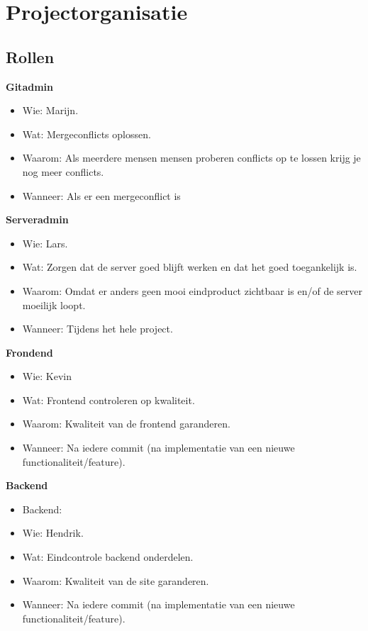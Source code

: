 \documentclass{uva-inf-article}
\begin{document}
\newpage
\section{Projectorganisatie}

\subsection{Rollen}
\textbf{Gitadmin}
\begin{itemize}[noitemsep]
  \item Wie: Marijn.
	\item Wat: Mergeconflicts oplossen.
	\item Waarom: Als meerdere mensen mensen proberen conflicts op te lossen krijg je nog meer conflicts.
\item Wanneer: Als er een mergeconflict is
\end{itemize}

\textbf{Serveradmin}
\begin{itemize}[noitemsep]
	\item Wie: Lars.
	\item Wat: Zorgen dat de server goed blijft werken en dat het goed toegankelijk is.  
	\item Waarom: Omdat er anders geen mooi eindproduct zichtbaar is en/of de server moeilijk loopt.
	\item Wanneer: Tijdens het hele project.
\end{itemize}

\textbf{Frondend}
\begin{itemize}[noitemsep]
	\item Wie: Kevin
	\item Wat: Frontend controleren op kwaliteit.
	\item Waarom: Kwaliteit van de frontend garanderen.
	\item Wanneer: Na iedere commit (na implementatie van een nieuwe functionaliteit/feature).
\end{itemize}

\textbf{Backend}
\begin{itemize}[noitemsep]
	\item Backend:
	\item Wie: Hendrik.
	\item Wat: Eindcontrole backend onderdelen.
	\item Waarom: Kwaliteit van de site garanderen.
	\item Wanneer: Na iedere commit (na implementatie van een nieuwe functionaliteit/feature).
\end{itemize}
\end{document}
